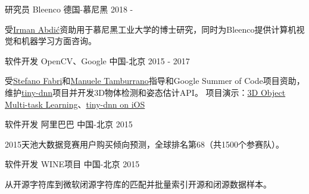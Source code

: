 


\begin{cventries}


\cventry
{研究员} %
{Bleenco} %
{德国-慕尼黑} %
{2018 -} %
{ %
\begin{cvitems}
\item {受\href{https://www.linkedin.com/in/irmanabdic/?originalSubdomain=de}{Irman Abdić}资助用于慕尼黑工业大学的博士研究，同时为Bleenco提供计算机视觉和机器学习方面咨询。}
\end{cvitems}
}

\cventry
{软件开发} %
{OpenCV、Google} %
{中国-北京} %
{2015 - 2017} %
{ %
\begin{cvitems}
\item {受\href{https://www.linkedin.com/in/stefano-fabri-16a73748}{Stefano Fabri}和\href{https://www.linkedin.com/in/manuele-tamburrano-b82384a5?authType=name&authToken=Di5p&trk=prof-sb-browse_map-name}{Manuele Tamburrano}指导和Google Summer of Code项目资助，维护\href{https://github.com/tiny-dnn/tiny-dnn}{tiny-dnn}项目并开发3D物体检测和姿态估计API。
项目演示：\href{https://www.youtube.com/watch?v=Mc20rTYdXTE}{3D Object Multi-task Learning}、\href{https://drive.google.com/open?id=0B-RYa1FDOrYXVUEzcG1mdnl5a3M}{tiny-dnn on iOS}
}
\end{cvitems}
}


\cventry
{软件开发} %
{阿里巴巴} %
{中国-北京} %
{2015} %
{ %
\begin{cvitems}
\item {2015天池大数据竞赛用户购买倾向预测，全球排名第68（共1500个参赛队）。}
\end{cvitems}
}


\cventry
{软件开发} %
{WINE项目} %
{中国-北京} %
{2015} %
{ %
\begin{cvitems}
\item {从开源字符库到微软闭源字符库的匹配并批量索引开源和闭源数据样本。}
\end{cvitems}
}


\end{cventries}
